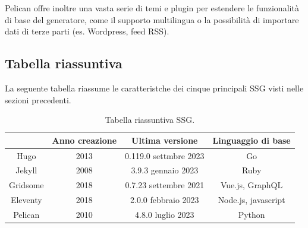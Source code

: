 \documentclass[target=bach,aauheader=]{thud}
\begin{document}
Pelican offre inoltre una vasta serie di temi e plugin per estendere le funzionalità di base del generatore, come il supporto multilingua o la possibilità di importare dati di terze parti (es. Wordpress, feed RSS).

\subsection{Tabella riassuntiva}
La seguente tabella riassume le caratteristche dei cinque principali SSG visti nelle sezioni precedenti.

\begin{table}[h]
    \centering
    \renewcommand{\arraystretch}{1.5}
    \begin{tabular}{|c|c|c|c|}
    \hline
     & Anno creazione & Ultima versione & Linguaggio di base \\
    \hline
    Hugo & 2013 & 0.119.0 settmbre 2023 & Go \\
    \hline
    Jekyll & 2008 & 3.9.3 gennaio 2023 & Ruby \\
    \hline
    Gridsome & 2018 & 0.7.23 settembre 2021 & Vue.js, GraphQL \\
    \hline
    Eleventy & 2018 & 2.0.0 febbraio 2023 & Node.js, javascript \\
    \hline
    Pelican & 2010 & 4.8.0 luglio 2023 & Python \\
    \hline
    \end{tabular}
    \caption{Tabella riassuntiva SSG.}
    \end{table}

\end{document}
